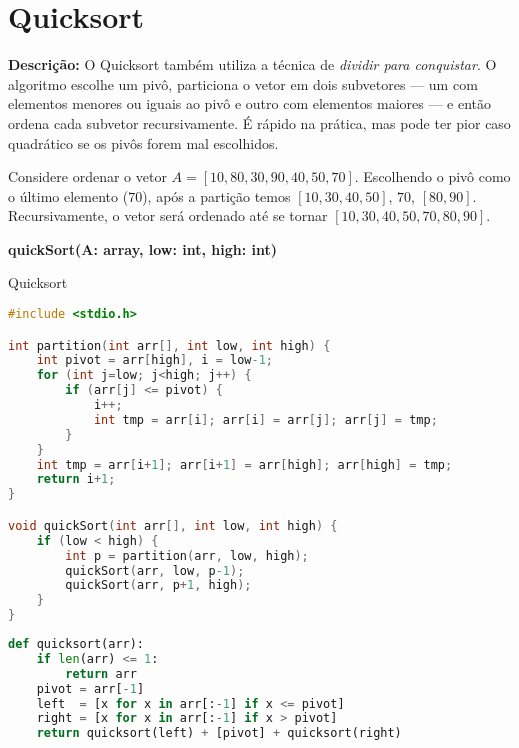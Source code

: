 \section{Quicksort}

\textbf{Descrição:} O Quicksort também utiliza a técnica de \textit{dividir para conquistar}. O algoritmo escolhe um pivô, particiona o vetor em dois subvetores — um com elementos menores ou iguais ao pivô e outro com elementos maiores — e então ordena cada subvetor recursivamente. É rápido na prática, mas pode ter pior caso quadrático se os pivôs forem mal escolhidos.

\begin{exmp}
Considere ordenar o vetor $A = [10, 80, 30, 90, 40, 50, 70]$.  
Escolhendo o pivô como o último elemento ($70$), após a partição temos $[10, 30, 40, 50]$, $70$, $[80, 90]$.  
Recursivamente, o vetor será ordenado até se tornar $[10, 30, 40, 50, 70, 80, 90]$.
\end{exmp}

\begin{algorithm}[H]
\DontPrintSemicolon
\textbf{quickSort(A: array, low: int, high: int)}\;
\caption{Quicksort}
\label{lab:alg-quickSort}
\end{algorithm}

\begin{lstlisting}[language=C, caption={Implementação do Quicksort em C}, label=code:quickSort]
#include <stdio.h>

int partition(int arr[], int low, int high) {
    int pivot = arr[high], i = low-1;
    for (int j=low; j<high; j++) {
        if (arr[j] <= pivot) {
            i++;
            int tmp = arr[i]; arr[i] = arr[j]; arr[j] = tmp;
        }
    }
    int tmp = arr[i+1]; arr[i+1] = arr[high]; arr[high] = tmp;
    return i+1;
}

void quickSort(int arr[], int low, int high) {
    if (low < high) {
        int p = partition(arr, low, high);
        quickSort(arr, low, p-1);
        quickSort(arr, p+1, high);
    }
}
\end{lstlisting}

\begin{lstlisting}[language=Python, caption={Quicksort em Python}, label=code:quickSortPy]
def quicksort(arr):
    if len(arr) <= 1:
        return arr
    pivot = arr[-1]
    left  = [x for x in arr[:-1] if x <= pivot]
    right = [x for x in arr[:-1] if x > pivot]
    return quicksort(left) + [pivot] + quicksort(right)
\end{lstlisting}

